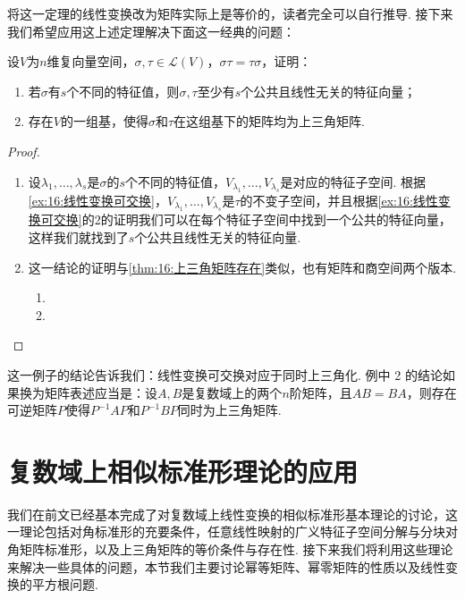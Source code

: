 将这一定理的线性变换改为矩阵实际上是等价的，读者完全可以自行推导. 接下来我们希望应用这上述定理解决下面这一经典的问题：
\begin{example} \label{ex:16:可交换与同时上三角化}
    设$V$为$n$维复向量空间，$\sigma,\tau\in \mathcal{L}(V)$，$\sigma\tau=\tau\sigma$，证明：
    \begin{enumerate}
        \item 若$\sigma$有$s$个不同的特征值，则$\sigma,\tau$至少有$s$个公共且线性无关的特征向量；

        \item 存在$V$的一组基，使得$\sigma$和$\tau$在这组基下的矩阵均为上三角矩阵.
    \end{enumerate}
\end{example}

\begin{proof}
    \begin{enumerate}
        \item 设$\lambda_1,\ldots,\lambda_s$是$\sigma$的$s$个不同的特征值，$V_{\lambda_1},\ldots,V_{\lambda_s}$是对应的特征子空间. 根据\autoref{ex:16:线性变换可交换}，$V_{\lambda_1},\ldots,V_{\lambda_s}$是$\tau$的不变子空间，并且根据\autoref{ex:16:线性变换可交换}的2的证明我们可以在每个特征子空间中找到一个公共的特征向量，这样我们就找到了$s$个公共且线性无关的特征向量.

        \item 这一结论的证明与\autoref{thm:16:上三角矩阵存在}类似，也有矩阵和商空间两个版本.
        \begin{enumerate}
            \item
            \item
        \end{enumerate}
    \end{enumerate}
\end{proof}

这一例子的结论告诉我们：线性变换可交换对应于同时上三角化. 例中 2 的结论如果换为矩阵表述应当是：设$A,B$是复数域上的两个$n$阶矩阵，且$AB=BA$，则存在可逆矩阵$P$使得$P^{-1}AP$和$P^{-1}BP$同时为上三角矩阵.

\section{复数域上相似标准形理论的应用}

我们在前文已经基本完成了对复数域上线性变换的相似标准形基本理论的讨论，这一理论包括对角标准形的充要条件，任意线性映射的广义特征子空间分解与分块对角矩阵标准形，以及上三角矩阵的等价条件与存在性. 接下来我们将利用这些理论来解决一些具体的问题，本节我们主要讨论幂等矩阵、幂零矩阵的性质以及线性变换的平方根问题.

